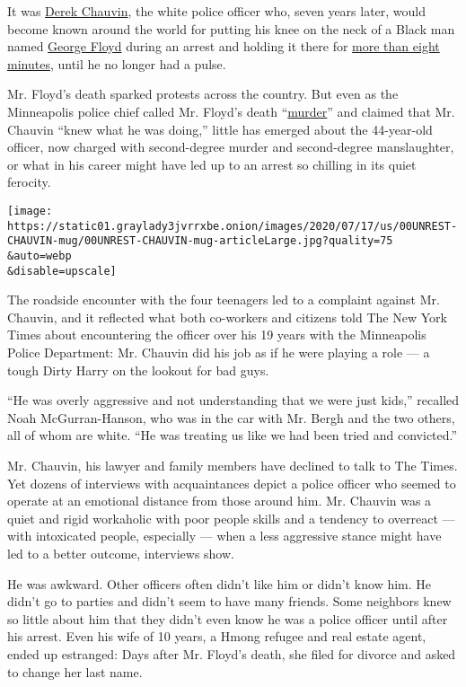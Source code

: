It was
\href{https://www.nytimes3xbfgragh.onion/2020/07/22/us/derek-chauvin-tax-fraud.html}{Derek
Chauvin}, the white police officer who, seven years later, would become
known around the world for putting his knee on the neck of a Black man
named
\href{https://www.nytimes3xbfgragh.onion/2020/07/22/us/derek-chauvin-tax-fraud.html}{George
Floyd} during an arrest and holding it there for
\href{https://www.nytimes3xbfgragh.onion/2020/05/31/us/george-floyd-investigation.html}{more
than eight minutes}, until he no longer had a pulse.

Mr. Floyd's death sparked protests across the country. But even as the
Minneapolis police chief called Mr. Floyd's death
``\href{https://www.cnn.com/2020/06/24/us/minneapolis-police-chief-comment-george-floyd-trnd/index.html}{murder}''
and claimed that Mr. Chauvin ``knew what he was doing,'' little has
emerged about the 44-year-old officer, now charged with second-degree
murder and second-degree manslaughter, or what in his career might have
led up to an arrest so chilling in its quiet ferocity.

\texttt{[image: https://static01.graylady3jvrrxbe.onion/images/2020/07/17/us/00UNREST-CHAUVIN-mug/00UNREST-CHAUVIN-mug-articleLarge.jpg?quality=75\\\&auto=webp\\\&disable=upscale]}

The roadside encounter with the four teenagers led to a complaint
against Mr. Chauvin, and it reflected what both co-workers and citizens
told The New York Times about encountering the officer over his 19 years
with the Minneapolis Police Department: Mr. Chauvin did his job as if he
were playing a role --- a tough Dirty Harry on the lookout for bad guys.

``He was overly aggressive and not understanding that we were just
kids,'' recalled Noah McGurran-Hanson, who was in the car with Mr. Bergh
and the two others, all of whom are white. ``He was treating us like we
had been tried and convicted.''

Mr. Chauvin, his lawyer and family members have declined to talk to The
Times. Yet dozens of interviews with acquaintances depict a police
officer who seemed to operate at an emotional distance from those around
him. Mr. Chauvin was a quiet and rigid workaholic with poor people
skills and a tendency to overreact --- with intoxicated people,
especially --- when a less aggressive stance might have led to a better
outcome, interviews show.

He was awkward. Other officers often didn't like him or didn't know him.
He didn't go to parties and didn't seem to have many friends. Some
neighbors knew so little about him that they didn't even know he was a
police officer until after his arrest. Even his wife of 10 years, a
Hmong refugee and real estate agent, ended up estranged: Days after Mr.
Floyd's death, she filed for divorce and asked to change her last name.


